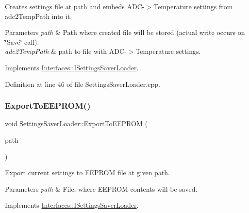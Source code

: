 Creates settings file at path and embeds A\+D\+C-\/$>$Temperature settings from adc2\+Temp\+Path into it. 


\begin{DoxyParams}{Parameters}
{\em path} & Path where created file will be stored (actual write occurs on \char`\"{}\+Save\char`\"{} call). \\
\hline
{\em adc2\+Temp\+Path} & path to file with A\+D\+C-\/$>$Temperature settings. \\
\hline
\end{DoxyParams}


Implements \hyperlink{class_interfaces_1_1_i_settings_saver_loader_a67e729cc53f53b6bdeb534dc62000531}{Interfaces\+::\+I\+Settings\+Saver\+Loader}.



Definition at line 46 of file Settings\+Saver\+Loader.\+cpp.

\mbox{\label{class_settings_saver_loader_a2a3e3c7f6f1f521b9423db4d63ddae74}} 
\subsubsection{\texorpdfstring{Export\+To\+E\+E\+P\+R\+O\+M()}{ExportToEEPROM()}}
{\footnotesize\ttfamily void Settings\+Saver\+Loader\+::\+Export\+To\+E\+E\+P\+R\+OM (\begin{DoxyParamCaption}\item[{Q\+String}]{path }\end{DoxyParamCaption})\hspace{0.3cm}{\ttfamily [virtual]}}



Export current settings to E\+E\+P\+R\+OM file at given path. 


\begin{DoxyParams}{Parameters}
{\em path} & File, where E\+E\+P\+R\+OM contents will be saved. \\
\hline
\end{DoxyParams}


Implements \hyperlink{class_interfaces_1_1_i_settings_saver_loader_a4f855492363276d81031d931a72a49a3}{Interfaces\+::\+I\+Settings\+Saver\+Loader}.



